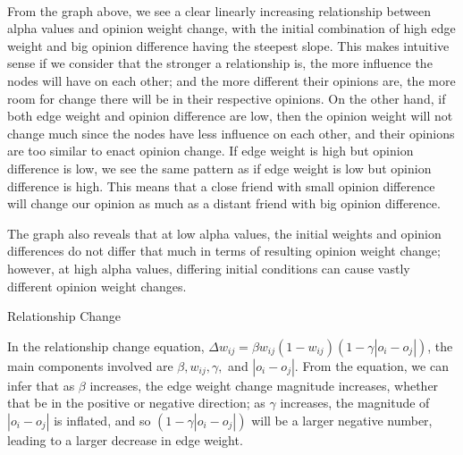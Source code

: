 \documentclass[11pt]{article}
\begin{document}
    \begin{center}
    \end{center}
    { \hspace*{\fill} \\}
    
    From the graph above, we see a clear linearly increasing relationship
between alpha values and opinion weight change, with the initial
combination of high edge weight and big opinion difference having the
steepest slope. This makes intuitive sense if we consider that the
stronger a relationship is, the more influence the nodes will have on
each other; and the more different their opinions are, the more room for
change there will be in their respective opinions. On the other hand, if
both edge weight and opinion difference are low, then the opinion weight
will not change much since the nodes have less influence on each other,
and their opinions are too similar to enact opinion change. If edge
weight is high but opinion difference is low, we see the same pattern as
if edge weight is low but opinion difference is high. This means that a
close friend with small opinion difference will change our opinion as
much as a distant friend with big opinion difference.

The graph also reveals that at low alpha values, the initial weights and
opinion differences do not differ that much in terms of resulting
opinion weight change; however, at high alpha values, differing initial
conditions can cause vastly different opinion weight changes.

Relationship Change

In the relationship change equation,
\(\Delta w_{ij} = \beta w_{ij}(1-w_{ij})(1-\gamma |o_i-o_j|)\), the main
components involved are \(\beta, w_{ij},\gamma,\) and \(|o_i - o_j|\).
From the equation, we can infer that as \(\beta\) increases, the edge
weight change magnitude increases, whether that be in the positive or
negative direction; as \(\gamma\) increases, the magnitude of
\(|o_i-o_j|\) is inflated, and so \((1-\gamma |o_i-o_j|)\) will be a
larger negative number, leading to a larger decrease in edge weight.
\end{document}
